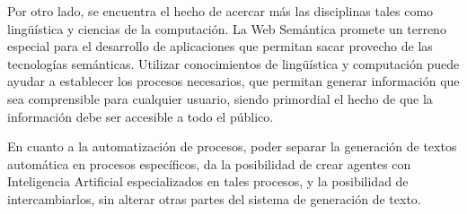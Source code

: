 \documentclass{report}
\begin{document}
Por otro lado, se encuentra el hecho de acercar más las disciplinas tales como lingüística y ciencias de la computación. La Web Semántica promete un terreno especial para el desarrollo de aplicaciones que permitan sacar provecho de las tecnologías semánticas. Utilizar conocimientos de lingüística y computación puede ayudar a establecer los procesos necesarios, que permitan generar información que sea comprensible para cualquier usuario, siendo primordial el hecho de que la información debe ser accesible a todo el público.

En cuanto a la automatización de procesos, poder separar la generación de textos automática en procesos específicos, da la posibilidad de crear agentes con Inteligencia Artificial especializados en tales procesos, y la posibilidad de intercambiarlos, sin alterar otras partes del sistema de generación de texto.















\end{document}
